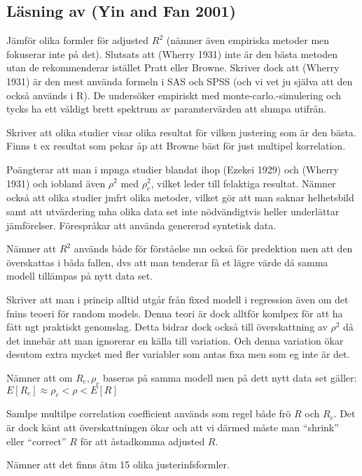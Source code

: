 \documentclass[]{article}
\begin{document}
\subsection{Läsning av (Yin and Fan 2001)}\label{lasning-av-yin2001}

Jämför olika formler för adjusted \(R^2\) (nämner även empiriska metoder
men fokuserar inte på det). Slutsats att (Wherry 1931) inte är den bästa
metoden utan de rekommenderar istället Pratt eller Browne. Skriver dock
att (Wherry 1931) är den mest använda formeln i SAS och SPSS (och vi vet
ju själva att den också används i R). De undersöker empiriskt med
monte-carlo.-simulering och tycks ha ett väldigt brett spektrum av
paramtervärden att slumpa utifrån.

Skriver att olika studier visar olika resultat för vilken justering som
är den bästa. Finns t ex resultat som pekar åp att Browne bäst för just
multipel korrelation.

Poängterar att man i mpnga studier blandat ihop (Ezekei 1929) och
(Wherry 1931) och iobland även \(\rho^2\) med \(\rho^2_c\), vilket leder
till felaktiga resultat. Nämner också att olika studier jmfrt olika
metoder, vilket gör att man saknar helhetsbild samt att utvärdering mha
olika data set inte nödvändigtvis heller underlättar jämförelser.
Förespråkar att använda genererad syntetisk data.

Nämner att \(R^2\) används både för förståelse mn också för predektion
men att den överskattas i båda fallen, dvs att man tenderar få et lägre
värde då samma modell tillämpas på nytt data set.

Skriver att man i princip alltid utgår från fixed modell i regression
även om det fnins teoeri för random models. Denna teori är dock alltför
komlpex för att ha fått ngt praktiskt genomslag. Detta bidrar dock också
till överskattning av \(\rho^2\) då det innebär att man ignorerar en
källa till variation. Och denna variation ökar desutom extra mycket med
fler variabler som antas fixa men som eg inte är det.

Nämner att om \(R_c, \rho_c\) baseras på samma modell men på dett nytt
data set gäller: \(E[R_c] \approx \rho_c < \rho < E[R]\)

Samlpe multilpe correlation coefficient används som regel både frö \(R\)
och \(R_c\). Det är dock känt att överskattningen ökar och att vi därmed
måste man ``shrink'' eller ``correct'' \(R\) för att åstadkomma adjusted
\(R\).

Nämner att det finns åtm 15 olika justerinfsformler.
\end{document}

